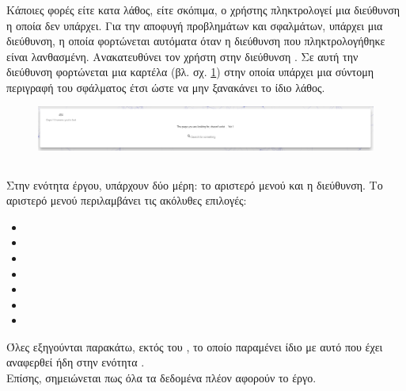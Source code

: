 \subsubsection*{}
\pSpace Κάποιες φορές είτε κατα λάθος, είτε σκόπιμα, ο χρήστης πληκτρολογεί μια διεύθυνση η οποία δεν υπάρχει. Για την αποφυγή προβλημάτων και σφαλμάτων, υπάρχει μια διεύθυνση, η οποία φορτώνεται αυτόματα όταν η διεύθυνση που πληκτρολογήθηκε είναι λανθασμένη. Ανακατευθύνει τον χρήστη στην διεύθυνση . Σε αυτή την διεύθυνση φορτώνεται μια καρτέλα (βλ. σχ. \ref{fig:404}) στην οποία υπάρχει μια σύντομη περιγραφή του σφάλματος έτσι ώστε να μην ξανακάνει το ίδιο λάθος.

\begin{figure}[!htb]
\includegraphics[width=\linewidth]{images/404.png}
\caption{}
\label{fig:404}
\end{figure}


\pagebreak

\subsection{}
\pSpace Στην ενότητα έργου, υπάρχουν δύο μέρη: το αριστερό μενού και η διεύθυνση. Το αριστερό μενού περιλαμβάνει τις ακόλυθες επιλογές:\\
\begin{itemize}
	\item {}
	\item {}
	\item {}
	\item {}
	\item {}
	\item {}
	\item {}
\end{itemize}
\pSpace Όλες εξηγούνται παρακάτω, εκτός του , το οποίο παραμένει ίδιο με αυτό που έχει αναφερθεί ήδη στην ενότητα .\\
\pSpace Επίσης, σημειώνεται πως όλα τα δεδομένα πλέον αφορούν το έργο.

